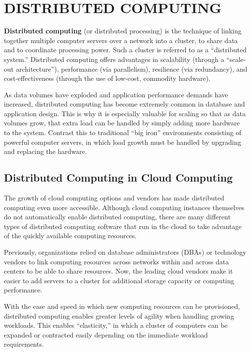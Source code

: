 \documentclass[../report.tex]{subfiles}
\begin{document}
\section{DISTRIBUTED COMPUTING} %

\textbf{Distributed computing} (or distributed processing) is the technique of linking together multiple computer servers over a network into a cluster, to share data and to coordinate processing power. Such a cluster is referred to as a “distributed system.” Distributed computing offers advantages in scalability (through a “scale-out architecture”), performance (via parallelism), resilience (via redundancy), and cost-effectiveness (through the use of low-cost, commodity hardware).

As data volumes have exploded and application performance demands have increased, distributed computing has become extremely common in database and application design. This is why it is especially valuable for scaling so that as data volumes grow, that extra load can be handled by simply adding more hardware to the system. Contrast this to traditional “big iron” environments consisting of powerful computer servers, in which load growth must be handled by upgrading and replacing the hardware.

\subsection{Distributed Computing in Cloud Computing}

The growth of cloud computing options and vendors has made distributed computing even more accessible. Although cloud computing instances themselves do not automatically enable distributed computing, there are many different types of distributed computing software that run in the cloud to take advantage of the quickly available computing resources.

Previously, organizations relied on database administrators (DBAs) or technology vendors to link computing resources across networks within and across data centers to be able to share resources. Now, the leading cloud vendors make it easier to add servers to a cluster for additional storage capacity or computing performance.

With the ease and speed in which new computing resources can be provisioned, distributed computing enables greater levels of agility when handling growing workloads. This enables “elasticity,” in which a cluster of computers can be expanded or contracted easily depending on the immediate workload requirements.
\end{document}
